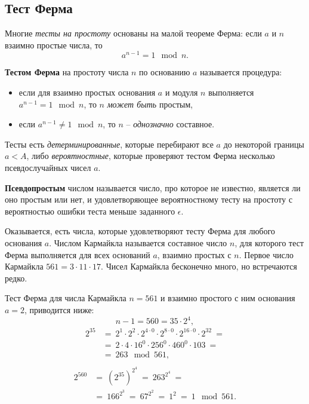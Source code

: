 \subsection{Тест Ферма}

Многие \emph{тесты на простоту} основаны на малой теореме Ферма: если $a$ и $n$ взаимно простые числа, то
    \[ a^{n-1} = 1 \mod n. \]

\textbf{Тестом Ферма} на простоту числа $n$ по основанию $a$ называется процедура:
\begin{itemize}
    \item если для взаимно простых основания $a$ и модуля $n$ выполняется $a^{n-1} = 1 \mod n$, то $n$ \emph{может быть} простым,
    \item если $a^{n-1} \ne 1 \mod n$, то $n$ -- \emph{однозначно} составное.
\end{itemize}

Тесты есть \emph{детерминированные}, которые перебирают все $a$ до некоторой границы $a < A$, либо \emph{вероятностные}, которые проверяют тестом Ферма несколько псевдослучайных чисел $a$.

\textbf{Псевдопростым} числом называется число, про которое не известно, является ли оно простым или нет, и удовлетворяющее вероятностному тесту на простоту с вероятностью ошибки теста меньше заданного $\epsilon$.

Оказывается, есть числа, которые удовлетворяют тесту Ферма для любого основания $a$. Числом Кармайкла называется составное число $n$, для которого тест Ферма выполняется для всех оснований $a$, взаимно простых с $n$. Первое число Кармайкла $561 = 3 \cdot 11 \cdot 17$. Чисел Кармайкла бесконечно много, но встречаются редко.

\example
Тест Ферма для числа Кармайкла $n = 561$ и взаимно простого с ним основания $a = 2$, приводится ниже:
\[
    n - 1 = 560 = 35 \cdot 2^4,
\] \[ \begin{array}{ll}
    2^{35} & =~ 2^1 \cdot 2^2 \cdot 2^{4 \cdot 0} \cdot 2^{8 \cdot 0} \cdot 2^{16 \cdot 0} \cdot 2^{32} ~= \\
        & =~ 2 \cdot 4 \cdot 16^0 \cdot 256^0 \cdot 460^0 \cdot 103 ~= \\
        & =~ 263 \mod 561, \\
\end{array} \] \[ \begin{array}{ll}
    2^{560} & =~ \left( 2^{35} \right)^{2^4} ~=~ 263^{2^4} ~= \\
        & =~ 166^{2^3} ~=~ 67^{2^2} ~=~ 1^{2} ~=~ 1 \mod 561.
\end{array} \]
\exampleend
